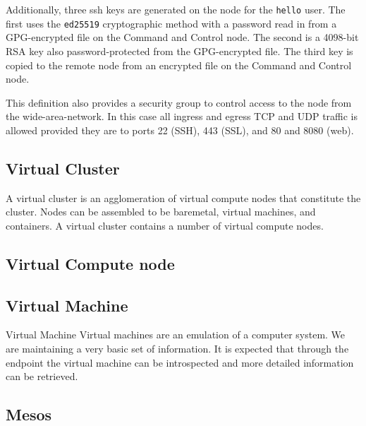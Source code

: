 \documentclass[9pt,twocolumn]{styles/osajnl}
\begin{document}
Additionally, three ssh keys are generated on the node for the
\verb|hello| user. The first uses the \verb|ed25519| cryptographic
method with a password read in from a GPG-encrypted file on the
Command and Control node. The second is a 4098-bit RSA key also
password-protected from the GPG-encrypted file. The third key is
copied to the remote node from an encrypted file on the Command and
Control node.

This definition also provides a security group to control access to
the node from the wide-area-network. In this case all ingress and
egress TCP and UDP traffic is allowed provided they are to ports 22
(SSH), 443 (SSL), and 80 and 8080 (web).





\subsection{Virtual Cluster}

A virtual cluster is an agglomeration of virtual compute nodes that
constitute the cluster. Nodes can be assembled to be baremetal,
virtual machines, and containers. A virtual cluster contains a number
of virtual compute nodes.  
 

\subsection{Virtual Compute node}


\subsection{Virtual Machine}

Virtual Machine 
Virtual machines are an emulation of a computer system. We are maintaining a very basic set of information. It is expected that through the endpoint the virtual machine can be introspected and more detailed information can be retrieved. 


\subsection{Mesos}
\end{document}
